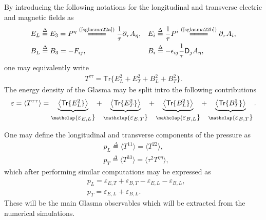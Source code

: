 By introducing the following notations for the longitudinal and transverse electric and magnetic fields as
\begin{equation*}
    \begin{aligned}
        &E_L\overset{\Delta}{=}E_3=P^\eta\stackrel{(\text{\cref{sglasma22a}})}{=\joinrel=\joinrel=\joinrel=}\frac{1}{\tau}\partial_\tau A_\eta, &&E_i\overset{\Delta}{=}\frac{1}{\tau}P^i\stackrel{(\text{\cref{sglasma22b}})}{=\joinrel=\joinrel=\joinrel=}\partial_\tau A_i, \\
        &B_L\overset{\Delta}{=}B_3=-F_{ij}, && B_i\overset{\Delta}{=}-\epsilon_{ij}\frac{1}{\tau}\textsf{D}_jA_\eta,
    \end{aligned}
\end{equation*}
one may equivalently write
\begin{align*}
    T^{\tau\tau}=\textsf{Tr}\Big\{E_L^2+E_T^2+B_L^2+B_T^2\Big\}.
\end{align*}
The energy density of the Glasma may be split intro the following contributions
\begin{align*}
    \varepsilon=\langle T^{\tau\tau}\rangle=\underbrace{\big\langle\textsf{Tr}\{E_L^2\}\big\rangle}_{\mathclap{\textstyle \varepsilon_{E,L}}}+\underbrace{\big\langle\textsf{Tr}\{E_T^2\}\big\rangle}_{\mathclap{\textstyle \varepsilon_{E,T}}}+\underbrace{\big\langle\textsf{Tr}\{B_L^2\}\big\rangle}_{\mathclap{\textstyle \varepsilon_{B,L}}}+\underbrace{\big\langle\textsf{Tr}\{B_T^2\}\big\rangle}_{\mathclap{\textstyle \varepsilon_{B,T}}}.
\end{align*}

One may define the longitudinal and transverse components of the pressure as
\begin{align*}
   &p_L\overset{\Delta}{=}\langle T^{11}\rangle=\langle T^{22}\rangle,\\
   &p_T\overset{\Delta}{=}\langle T^{33}\rangle=\langle\tau^2 T^{\eta\eta}\rangle,
\end{align*}
which after performing similar computations may be expressed as
\begin{align*}
    &p_L=\varepsilon_{E,T}+\varepsilon_{B,T}-\varepsilon_{E,L}-\varepsilon_{B,L},\\
    &p_T=\varepsilon_{E,L}+\varepsilon_{B,L}.
\end{align*}
These will be the main Glasma observables which will be extracted from the numerical simulations.

